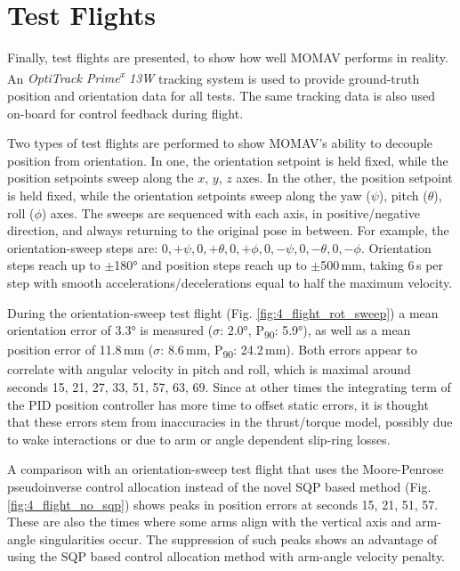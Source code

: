 \documentclass[conference]{IEEEtran}
\begin{document}
\section{Test Flights}
Finally, test flights are presented, to show how well MOMAV performs in reality. An \textit{OptiTrack Prime\textsuperscript{x} 13W} tracking system is used to provide ground-truth position and orientation data for all tests. The same tracking data is also used on-board for control feedback during flight.
\par
Two types of test flights are performed to show MOMAV's ability to decouple position from orientation. In one, the orientation setpoint is held fixed, while the position setpoints sweep along the $x$, $y$, $z$ axes. In the other, the position setpoint is held fixed, while the orientation setpoints sweep along the yaw ($\psi$), pitch ($\theta$), roll ($\phi$) axes. The sweeps are sequenced with each axis, in positive/negative direction, and always returning to the original pose in between. For example, the orientation-sweep steps are: $0, +\psi, 0, +\theta, 0, +\phi, 0, -\psi, 0, -\theta, 0, -\phi$. Orientation steps reach up to $\pm$180° and position steps reach up to $\pm$500\,mm, taking 6\,s per step with smooth accelerations/decelerations equal to half the maximum velocity.
\par
During the orientation-sweep test flight (Fig. \ref{fig:4_flight_rot_sweep}) a mean orientation error of 3.3° is measured ($\sigma$: 2.0°, P\textsubscript{90}: 5.9°), as well as a mean position error of 11.8\,mm ($\sigma$: 8.6\,mm, P\textsubscript{90}: 24.2\,mm). Both errors appear to correlate with angular velocity in pitch and roll, which is maximal around seconds 15, 21, 27, 33, 51, 57, 63, 69. Since at other times the integrating term of the PID position controller has more time to offset static errors, it is thought that these errors stem from inaccuracies in the thrust/torque model, possibly due to wake interactions or due to arm or angle dependent slip-ring losses.
\par
A comparison with an orientation-sweep test flight that uses the Moore-Penrose pseudoinverse control allocation instead of the novel SQP based method (Fig. \ref{fig:4_flight_no_sqp}) shows peaks in position errors at seconds 15, 21, 51, 57. These are also the times where some arms align with the vertical axis and arm-angle singularities occur. The suppression of such peaks shows an advantage of using the SQP based control allocation method with arm-angle velocity penalty.
\par
\end{document}
